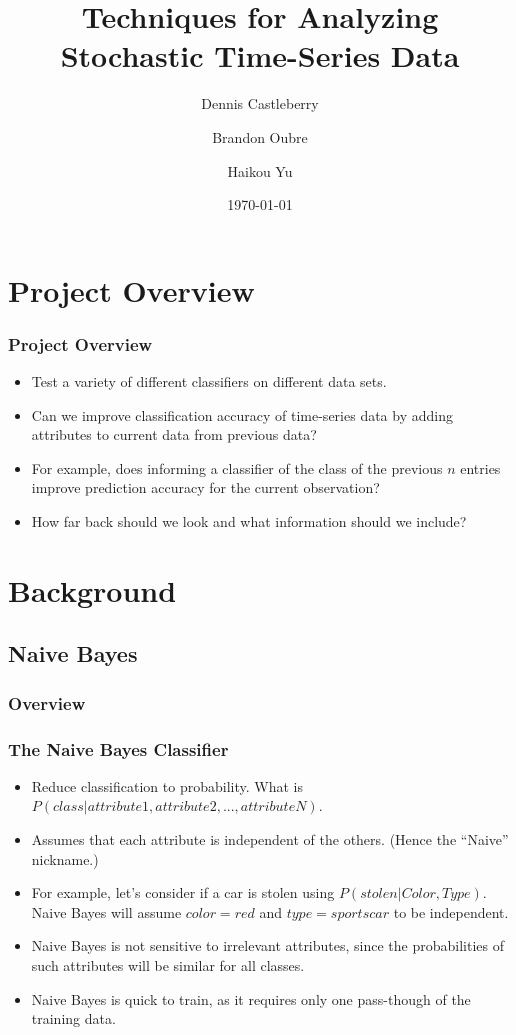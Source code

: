 \documentclass[mathserif]{beamer}
\begin{document}
	\title[Analyzing Stochastic Time-Series Data]{Techniques for Analyzing Stochastic Time-Series Data}
	\author[Castleberry \and Oubre \and Yu]{Dennis Castleberry \and Brandon Oubre \and Haikou Yu}
	\date{\today}
	\frame{\titlepage}
	
	\section{Project Overview}
	\begin{frame}
		\frametitle{Project Overview}
		\begin{itemize}
			\item Test a variety of different classifiers on different data sets.
			\item Can we improve classification accuracy of time-series data by adding attributes to current data from previous data?
			\item For example, does informing a classifier of the class of the previous \(n\) entries improve prediction accuracy for the current observation?
			\item How far back should we look and what information should we include?
		\end{itemize}
	\end{frame}
	
	\section{Background}
	\subsection{Naive Bayes}
	\subsubsection{Overview}
	\begin{frame}
		\frametitle{The Naive Bayes Classifier}
		\begin{itemize}
			\item Reduce classification to probability. What is \(P(class | attribute1, attribute2, ..., attributeN)\).
			\item Assumes that each attribute is independent of the others. (Hence the ``Naive'' nickname.)
			\item For example, let's consider if a car is stolen using \(P(stolen | Color, Type)\). Naive Bayes will assume \(color=red\) and \(type=sportscar\) to be independent.
			\item Naive Bayes is not sensitive to irrelevant attributes, since the probabilities of such attributes will be similar for all classes.
			\item Naive Bayes is quick to train, as it requires only one pass-though of the training data.
		\end{itemize}
	\end{frame}
	
\end{document}
